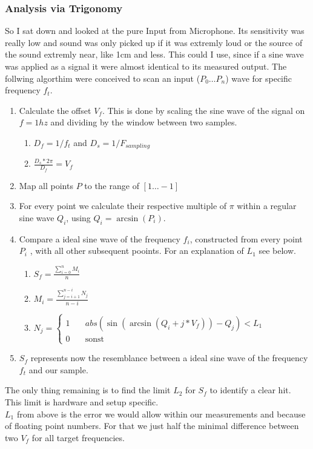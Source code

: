 \documentclass{book}
\begin{document}
\subsubsection{Analysis via Trigonomy}
So I sat down and looked at the pure Input from Microphone. Its sensitivity was really low and sound was only picked up if it was extremly loud or the source of the sound extremly near, like 1cm and less. This could I use, since if a sine wave was applied as a signal it were almost identical to its measured output. The follwing algorthim were conceived to scan an input ($P_0\dots P_{n}$) wave for specific frequency $f_t$.
\begin{enumerate}
\item Calculate the offset $V_{f}$. This is done by scaling the sine wave of the signal on $f=1hz$ and dividing by the window between two samples. 
\begin{enumerate}
\item $D_f=1/f_t$ and $D_s=1/F_{sampling}$
\item $\frac{D_s*2\pi}{D_f}=V_f$
\end{enumerate}
\item Map all points $P$ to the range of $[1\dots-1]$
\item For every point we calculate their respective multiple of $\pi$ within a regular sine wave $Q_i$, using $Q_i=\arcsin(P_i)$.
\item Compare a ideal sine wave of the frequency $f_i$, constructed from every point $P_i$ , with all other subsequent pooints. For an explanation of $L_1$ see below.
\begin{enumerate}
\item $S_f=\frac{\sum_{i=0}^{n}M_i}{n}$
\item $M_i=\frac{\sum_{j=i+1}^{n-i}{N_j}}{n-i}$
\item 	$N_j=
		\begin{cases}
		1&\quad abs(\sin(\arcsin(Q_i+j*V_f))-Q_j)<L_1\\
		0&\quad \text{sonst}
		\end{cases}
		$
\end{enumerate}
\item $S_f$ represents now the resemblance between a ideal sine wave of the frequency $f_t$ and our sample. 
\end{enumerate}
The only thing remaining is to find the limit $L_2$ for $S_f$ to identify a clear hit. This limit is hardware and setup specific.
\\$L_1$ from above is the error we would allow within our measurements and because of floating point numbers. For that we just half the minimal difference between two $V_f$ for all target frequencies.
\end{document}
